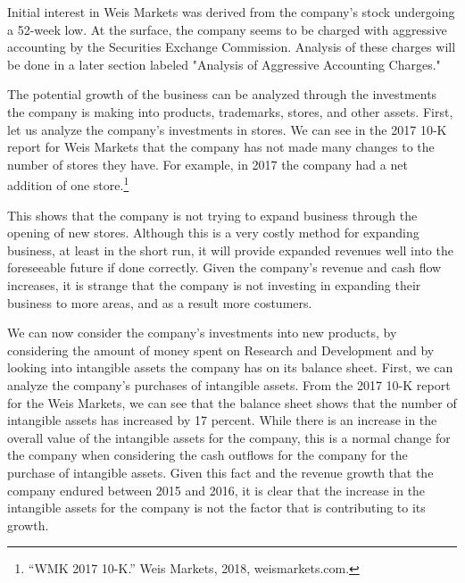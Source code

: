 \documentclass[12pt]{article}
\begin{document}
\begin{doublespacing}
Initial interest in Weis Markets was derived from the company’s stock undergoing a 52-week low. At the surface, the company seems to be charged with aggressive accounting by the Securities Exchange Commission. Analysis of these charges will be done in a later section labeled "Analysis of Aggressive Accounting Charges."

The potential growth of the business can be analyzed through the investments the company is making into products, trademarks, stores, and other assets. First, let us analyze the company's investments in stores. We can  see in the 2017 10-K report for Weis Markets that the company has not made many changes to the number of stores they have. For example, in 2017 the company had a net addition of one store.\footnote{“WMK 2017 10-K.” Weis Markets, 2018, weismarkets.com.}

This shows that the company is not trying to expand business through the opening of new stores. Although this is a very costly method for expanding business, at least in the short run, it will provide expanded revenues well into the foreseeable future if done correctly. Given the company's revenue and cash flow increases, it is strange that the company is not investing in expanding their business to more areas, and as a result more costumers. 

We can now consider the company's investments into new products, by considering the amount of money spent on Research and Development and by looking into intangible assets the company has on its balance sheet. First, we can analyze the company's purchases of intangible assets. From the 2017 10-K report for the Weis Markets, we can see that the balance sheet shows that the number of intangible assets has increased by 17 percent. While there is an increase in the overall value of the intangible assets for the company, this is a normal change for the company when considering the cash outflows for the company for the purchase of intangible assets. Given this fact and the revenue growth that the company endured between 2015 and 2016, it is clear that the increase in the intangible assets for the company is not the factor that is contributing to its growth.


\end{doublespacing}
\end{document}

